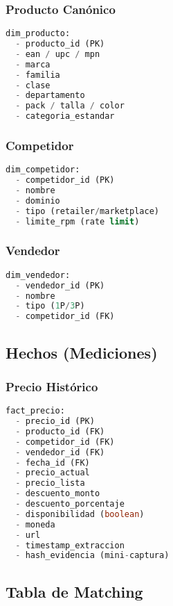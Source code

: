 \documentclass[12pt,a4paper]{article}
\begin{document}
\subsubsection*{Producto Canónico}
\begin{lstlisting}[language=SQL, basicstyle=\small\ttfamily, frame=single]
dim_producto:
  - producto_id (PK)
  - ean / upc / mpn
  - marca
  - familia
  - clase
  - departamento
  - pack / talla / color
  - categoria_estandar
\end{lstlisting}

\subsubsection*{Competidor}
\begin{lstlisting}[language=SQL, basicstyle=\small\ttfamily, frame=single]
dim_competidor:
  - competidor_id (PK)
  - nombre
  - dominio
  - tipo (retailer/marketplace)
  - limite_rpm (rate limit)
\end{lstlisting}

\subsubsection*{Vendedor}
\begin{lstlisting}[language=SQL, basicstyle=\small\ttfamily, frame=single]
dim_vendedor:
  - vendedor_id (PK)
  - nombre
  - tipo (1P/3P)
  - competidor_id (FK)
\end{lstlisting}

\subsection{Hechos (Mediciones)}

\subsubsection*{Precio Histórico}
\begin{lstlisting}[language=SQL, basicstyle=\small\ttfamily, frame=single]
fact_precio:
  - precio_id (PK)
  - producto_id (FK)
  - competidor_id (FK)
  - vendedor_id (FK)
  - fecha_id (FK)
  - precio_actual
  - precio_lista
  - descuento_monto
  - descuento_porcentaje
  - disponibilidad (boolean)
  - moneda
  - url
  - timestamp_extraccion
  - hash_evidencia (mini-captura)
\end{lstlisting}

\subsection{Tabla de Matching}
\end{document}
